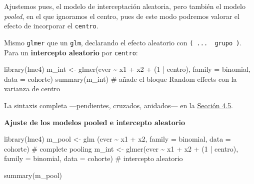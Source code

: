 \documentclass[
  letterpaper,
  DIV=11,
  numbers=noendperiod]{scrartcl}
\newenvironment{Shaded}{\begin{snugshade}}{\end{snugshade}}
\newcommand{\AttributeTok}[1]{\textcolor[rgb]{0.40,0.45,0.13}{#1}}
\newcommand{\CommentTok}[1]{\textcolor[rgb]{0.37,0.37,0.37}{#1}}
\newcommand{\DecValTok}[1]{\textcolor[rgb]{0.68,0.00,0.00}{#1}}
\newcommand{\FunctionTok}[1]{\textcolor[rgb]{0.28,0.35,0.67}{#1}}
\newcommand{\NormalTok}[1]{\textcolor[rgb]{0.00,0.23,0.31}{#1}}
\newcommand{\OtherTok}[1]{\textcolor[rgb]{0.00,0.23,0.31}{#1}}
\newcommand{\SpecialCharTok}[1]{\textcolor[rgb]{0.37,0.37,0.37}{#1}}
\begin{document}
Ajustemos pues, el modelo de interceptación aleatoria, pero también el
modelo \emph{pooled}, en el que ignoramos el centro, pues de este modo
podremos valorar el efecto de incorporar el \texttt{centro}.

\begin{tcolorbox}[enhanced jigsaw, breakable, colframe=quarto-callout-tip-color-frame, left=2mm, arc=.35mm, colbacktitle=quarto-callout-tip-color!10!white, toprule=.15mm, colback=white, coltitle=black, rightrule=.15mm, opacitybacktitle=0.6, title=\textcolor{quarto-callout-tip-color}{\faLightbulb}\hspace{0.5em}{🔧 En R. Ajustar un GLMM de intercepto aleatorio}, titlerule=0mm, toptitle=1mm, bottomtitle=1mm, leftrule=.75mm, bottomrule=.15mm, opacityback=0]

Mismo \texttt{glmer} que un \texttt{glm}, declarando el efecto aleatorio
con \texttt{(\ ...\ \textbar{}\ grupo\ )}. Para un \textbf{intercepto
aleatorio} por \texttt{centro}:

\begin{Shaded}
\begin{Highlighting}[]
\FunctionTok{library}\NormalTok{(lme4)}
\NormalTok{m\_int }\OtherTok{\textless{}{-}} \FunctionTok{glmer}\NormalTok{(ever }\SpecialCharTok{\textasciitilde{}}\NormalTok{ x1 }\SpecialCharTok{+}\NormalTok{ x2 }\SpecialCharTok{+}\NormalTok{ (}\DecValTok{1} \SpecialCharTok{|}\NormalTok{ centro), }\AttributeTok{family =}\NormalTok{ binomial, }\AttributeTok{data =}\NormalTok{ cohorte)}
\FunctionTok{summary}\NormalTok{(m\_int)        }\CommentTok{\# añade el bloque \textquotesingle{}Random effects\textquotesingle{} con la varianza de centro}
\end{Highlighting}
\end{Shaded}

La sintaxis completa ---pendientes, cruzados, anidados--- en la
\protect\hyperlink{sec-u14-extensiones}{Sección 4.5}.

\end{tcolorbox}

\textbf{Ajuste de los modelos pooled e intercepto aleatorio}

\begin{Shaded}
\begin{Highlighting}[]
\FunctionTok{library}\NormalTok{(lme4)}
\NormalTok{m\_pool }\OtherTok{\textless{}{-}} \FunctionTok{glm}\NormalTok{  (ever }\SpecialCharTok{\textasciitilde{}}\NormalTok{ x1 }\SpecialCharTok{+}\NormalTok{ x2,                }\AttributeTok{family =}\NormalTok{ binomial, }\AttributeTok{data =}\NormalTok{ cohorte)  }\CommentTok{\# complete pooling}
\NormalTok{m\_int  }\OtherTok{\textless{}{-}} \FunctionTok{glmer}\NormalTok{(ever }\SpecialCharTok{\textasciitilde{}}\NormalTok{ x1 }\SpecialCharTok{+}\NormalTok{ x2 }\SpecialCharTok{+}\NormalTok{ (}\DecValTok{1} \SpecialCharTok{|}\NormalTok{ centro),  }\AttributeTok{family =}\NormalTok{ binomial, }\AttributeTok{data =}\NormalTok{ cohorte)  }\CommentTok{\# intercepto aleatorio}

\FunctionTok{summary}\NormalTok{(m\_pool)}
\end{Highlighting}
\end{Shaded}
\end{document}
